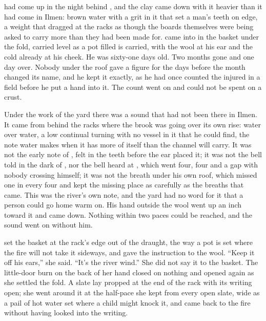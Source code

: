 
 had come up in the night behind , and the clay came down with it heavier than it had come in Ilmen: brown water with a grit in it that set a man's teeth on edge, a weight that dragged at the racks as though the boards themselves were being asked to carry more than they had been made for.  came into  in the basket under the fold, carried level as a pot filled is carried, with the wool at his ear and the cold already at his cheek. He was sixty-one days old. Two months gone and one day over. Nobody under the roof gave a figure for the days before the month changed its name, and he kept it exactly, as he had once counted the injured in a field before he put a hand into it. The count went on and could not be spent on a crust.

Under the work of the yard there was a sound that had not been there in Ilmen. It came from behind the racks where the brook was going over its own rise: water over water, a low continual turning with no vessel in it that he could find, the note water makes when it has more of itself than the channel will carry. It was not the early note of , felt in the teeth before the ear placed it; it was not the bell told in the dark of , nor the bell heard at , which went four, four and a gap with nobody crossing himself; it was not the breath under his own roof, which missed one in every four and kept the missing place as carefully as the breaths that came. This was the river's own note, and the yard had no word for it that a person could go home warm on. His hand outside the wool went up an inch toward it and came down. Nothing within two paces could be reached, and the sound went on without him.

 set the basket at the rack's edge out of the draught, the way a pot is set where the fire will not take it sideways, and gave the instruction to the wool. “Keep it off his ears,” she said. “It's the river wind.” She did not say it to the basket. The little-door burn on the back of her hand closed on nothing and opened again as she settled the fold. A slate lay propped at the end of the rack with its writing open; she went around it at the half-pace she kept from every open slate, wide as a pail of hot water set where a child might knock it, and came back to the fire without having looked into the writing.

